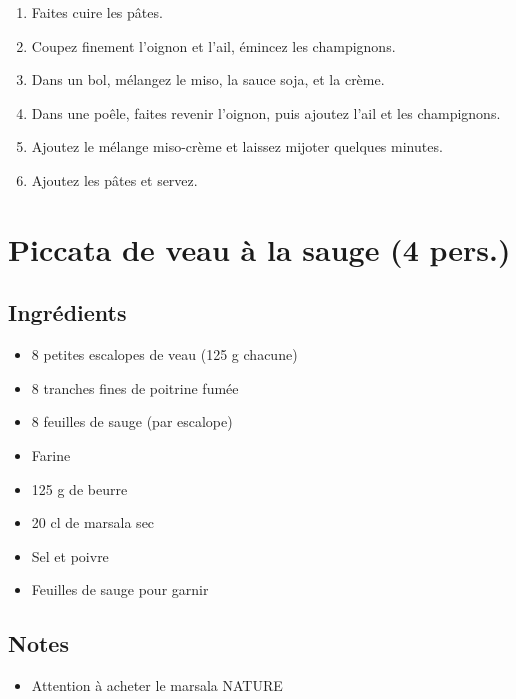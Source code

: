 \begin{enumerate}
\def\labelenumi{\arabic{enumi}.}

\item
  Faites cuire les pâtes.
\item
  Coupez finement l'oignon et l'ail, émincez les champignons.
\item
  Dans un bol, mélangez le miso, la sauce soja, et la crème.
\item
  Dans une poêle, faites revenir l'oignon, puis ajoutez l'ail et les
  champignons.
\item
  Ajoutez le mélange miso-crème et laissez mijoter quelques minutes.
\item
  Ajoutez les pâtes et servez.
\end{enumerate}

\section{Piccata de veau à la sauge (4
pers.)}\label{piccata-de-veau-uxe0-la-sauge-4-pers.}

\subsection{Ingrédients}\label{ingruxe9dients-8}

\begin{itemize}

\item
  8 petites escalopes de veau (125 g chacune)
\item
  8 tranches fines de poitrine fumée
\item
  8 feuilles de sauge (par escalope)
\item
  Farine
\item
  125 g de beurre
\item
  20 cl de marsala sec
\item
  Sel et poivre
\item
  Feuilles de sauge pour garnir
\end{itemize}

\subsection{Notes}\label{notes-1}

\begin{itemize}

\item
  Attention à acheter le marsala NATURE
\end{itemize}

